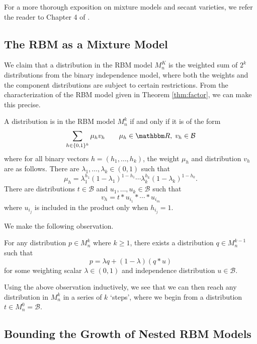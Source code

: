 \documentclass[11pt,titlepage]{article}
\newcommand*{\Bin}{\mathcal{B}}
\numberwithin{equation}{section}
\begin{document}
    For a more thorough exposition on mixture models and secant varieties, we
    refer the reader to Chapter 4 of \cite{DSS08}.

\subsection{The RBM as a Mixture Model}

    We claim that a distribution in the RBM model $M_n^K$ is the weighted sum of
    $2^k$ distributions from the binary independence model, where both the
    weights and the component distributions are subject to certain restrictions.
    From the characterization of the RBM model given in Theorem
    \ref{thm:factor}, we can make this precise.
    \begin{proposition}
    A distribution is in the RBM model $M_n^k$ if and only if it is of the form
    \[
        \sum_{h \in \{0,1\}^k} \mu_h v_h
        \qquad
        \mu_h \in \R, \;
        v_h \in \Bin
    \]
    where for all binary vectors $h = (h_1, \ldots, h_k)$, the weight $\mu_h$
    and distribution $v_h$ are as follows.  There are $\lambda_1, \ldots,
    \lambda_k \in (0,1)$ such that
    \[
        \mu_h = \lambda_1^{h_1}(1 - \lambda_1)^{1-h_1} \cdots
        \lambda_k^{h_k}(1-\lambda_k)^{1-h_k}.
    \]
    There are distributions $t \in \Bin$ and $u_1, \ldots, u_k \in \Bin$ such
    that
    \[
        v_h = t * u_{i_1} * \cdots * u_{i_m}
    \]
    where $u_{i_j}$ is included in the product only when $h_{i_j} = 1$.
    \end{proposition}

    We make the following observation.
    \begin{proposition}
        For any distribution $p \in M_n^k$ where $k \ge 1$, there exists a
        distribution $q \in M_n^{k-1}$ such that
        \[
            p = \lambda q + (1 - \lambda)(q * u)
        \]
        for some weighting scalar $\lambda \in (0,1)$ and independence
        distribution $u \in \Bin$.
    \end{proposition}
    Using the above observation inductively, we see that we can then reach any
    distribution in $M_n^k$ in a series of $k$ `steps', where we begin from a
    distribution $t \in M_n^0 = \Bin$.

\subsection{Bounding the Growth of Nested RBM Models}
\end{document}
